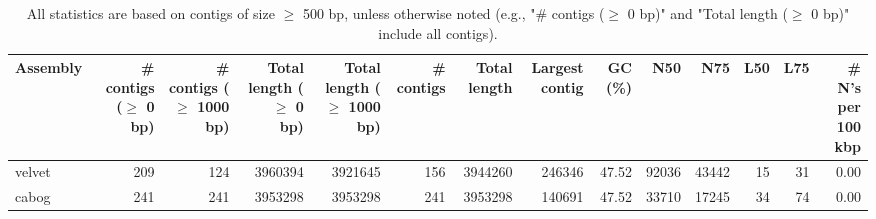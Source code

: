 \documentclass[12pt,a4paper]{article}
\begin{document}
\begin{table}[ht]
\begin{center}
\caption{All statistics are based on contigs of size $\geq$ 500 bp, unless otherwise noted (e.g., "\# contigs ($\geq$ 0 bp)" and "Total length ($\geq$ 0 bp)" include all contigs).}
\begin{tabular}{|l*{13}{|r}|}
\hline
Assembly & \# contigs ($\geq$ 0 bp) & \# contigs ($\geq$ 1000 bp) & Total length ($\geq$ 0 bp) & Total length ($\geq$ 1000 bp) & \# contigs & Total length & Largest contig & GC (\%) & N50 & N75 & L50 & L75 & \# N's per 100 kbp \\ \hline
velvet & 209 & 124 & 3960394 & 3921645 & 156 & 3944260 & 246346 & 47.52 & 92036 & 43442 & 15 & 31 & 0.00 \\ \hline
cabog & 241 & 241 & 3953298 & 3953298 & 241 & 3953298 & 140691 & 47.52 & 33710 & 17245 & 34 & 74 & 0.00 \\ \hline
\end{tabular}
\end{center}
\end{table}
\end{document}

